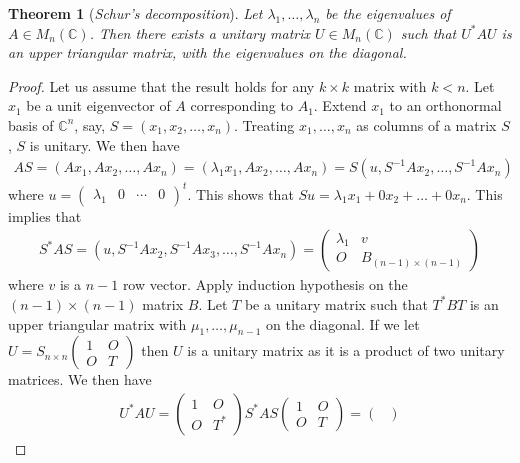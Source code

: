 \documentclass[15pt,a4paper]{book}
\newtheorem{theorem}{Theorem}[chapter]
\theoremstyle{definition}
\newcommand{\eax}[1]{\emph{#1}\index{#1}} %
\newcommand{\C}{\mathbb{C}}
\begin{document}
\begin{theorem}[\eax{Schur's decomposition}]
    Let $\lambda_{1},\ldots,\lambda_{n}$ be the eigenvalues of $A \in M_{n}(\C)$. Then there exists a unitary matrix $U \in M_{n}(\C)$ such that $U^{\ast}AU$ is an upper triangular matrix, with the eigenvalues on the diagonal.
\end{theorem}
\begin{proof}
    Let us assume that the result holds for any $k \times k$ matrix with $k < n$. Let $x_{1}$ be a unit eigenvector of $A$ corresponding to $A_{1}$. Extend $x_{1}$ to an orthonormal basis of $\C^{n}$, say, $S = (x_{1},x_{2},\ldots,x_{n})$. Treating $x_{1},\ldots,x_{n}$ as columns of a matrix $S$, $S$ is unitary. We then have
    \begin{align}
        AS = (Ax_{1},Ax_{2},\ldots,Ax_{n}) = (\lambda_{1}x_{1},Ax_{2},\ldots,Ax_{n}) = S(u, S^{-1}Ax_{2},\ldots,S^{-1}Ax_{n})
    \end{align}
    where $u = \begin{pmatrix}
        \lambda_{1} & 0 & \cdots & 0
    \end{pmatrix}^{t}$. This shows that $Su = \lambda_{1}x_{1} + 0x_{2} + \ldots + 0x_{n}$. This implies that
    \begin{align}
        S^{\ast}AS = (u,S^{-1}Ax_{2},S^{-1}Ax_{3},\ldots,S^{-1}Ax_{n}) = \begin{pmatrix}
            \lambda_{1} & v \\ O & B_{(n-1) \times (n-1)}
        \end{pmatrix}
    \end{align}
    where $v$ is a $n-1$ row vector. Apply induction hypothesis on the $(n-1) \times (n-1)$ matrix $B$. Let $T$ be a unitary matrix such that $T^{\ast}BT$ is an upper triangular matrix with $\mu_{1},\ldots,\mu_{n-1}$ on the diagonal. If we let $U = S_{n \times n} \begin{pmatrix}
        1 & O \\ O & T
    \end{pmatrix}$ then $U$ is a unitary matrix as it is a product of two unitary matrices. We then have
    \begin{align}
        U^{\ast}AU = \begin{pmatrix}
            1 & O \\ O & T^{\ast}
        \end{pmatrix} S^{\ast} AS \begin{pmatrix}
            1 & O \\ O & T
        \end{pmatrix} = \begin{pmatrix}

\end{pmatrix}
\end{align}
\end{proof}
\end{document}
